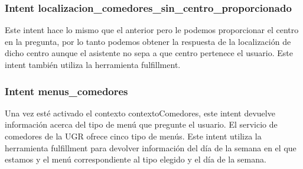 \vspace{5 mm}

\subsubsection{Intent localizacion_comedores_sin_centro_proporcionado}

\vspace{5 mm}

Este intent hace lo mismo que el anterior pero le podemos proporcionar el centro en la pregunta, por lo tanto podemos obtener la respuesta de la localización de dicho centro aunque el asistente no sepa a que centro pertenece el usuario. Este intent también utiliza la herramienta fulfillment.

\vspace{5 mm}

\subsubsection{Intent menus_comedores}

\vspace{5 mm}

Una vez esté activado el contexto contextoComedores, este intent devuelve información acerca del tipo de menú que pregunte el usuario. El servicio de comedores de la UGR ofrece cinco tipo de menús. Este intent utiliza la herramienta fulfillment para devolver información del día de la semana en el que estamos y el menú correspondiente al tipo elegido y el día de la semana.
